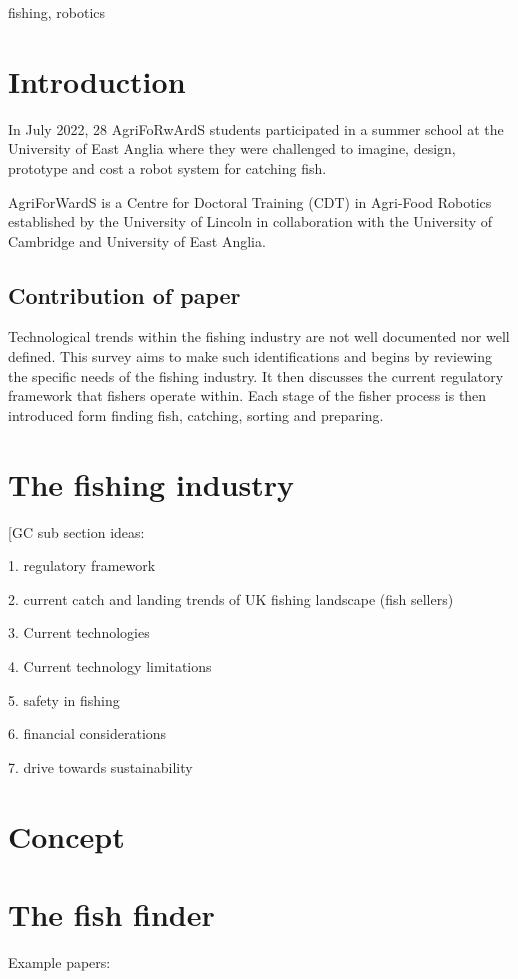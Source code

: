 \documentclass[conference]{IEEEtran}
\begin{document}
\begin{IEEEkeywords}
fishing, robotics
\end{IEEEkeywords}

\section{Introduction}

In July 2022, 28 AgriFoRwArdS students participated in a summer school
at the University of East Anglia where they were challenged to
imagine, design, prototype and cost a robot system for catching fish.

AgriForWardS is a Centre for Doctoral Training (CDT) in Agri-Food
Robotics established by the University of Lincoln in collaboration
with the University of Cambridge and University of East Anglia.

    \subsection{Contribution of paper}
Technological trends within the fishing industry are not well documented nor well defined. 
This survey aims to make such identifications and begins by reviewing the specific needs of the fishing industry.
It then discusses the current regulatory framework that fishers operate within.
Each stage of the fisher process is then introduced form finding fish, catching, sorting and preparing. 

\section{The fishing industry}
[GC sub section ideas:

1. regulatory framework

2. current catch and landing trends of UK fishing landscape (fish sellers)

3. Current technologies \cite{b4}

4. Current technology limitations

5. safety in fishing

6. financial considerations

7. drive towards sustainability



\section{Concept}

\section{The fish finder}
Example papers: \cite{b7} \cite{b8} \cite{b9} \cite{b10}
\end{document}
